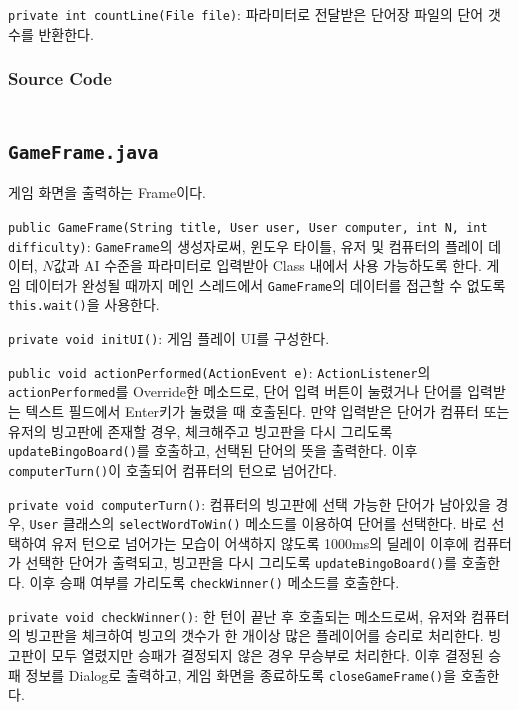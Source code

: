 \texttt{private int countLine(File file)}:
파라미터로 전달받은 단어장 파일의 단어 갯수를 반환한다.

\subsubsection{Source Code}
\inputminted[fontsize=\scriptsize]{java}{../../src/main/java/ywrhee/project/StartFrame.java}

\newpage
\subsection{\texttt{GameFrame.java}}
게임 화면을 출력하는 Frame이다.

\texttt{public GameFrame(String title, User user, User computer, int N, int difficulty)}:
\texttt{GameFrame}의 생성자로써, 윈도우 타이틀, 유저 및 컴퓨터의 플레이 데이터, $N$값과 AI 수준을 파라미터로 입력받아 Class 내에서 사용 가능하도록 한다.
게임 데이터가 완성될 때까지 메인 스레드에서 \texttt{GameFrame}의 데이터를 접근할 수 없도록 \texttt{this.wait()}을 사용한다.

\texttt{private void initUI()}:
게임 플레이 UI를 구성한다.

\texttt{public void actionPerformed(ActionEvent e)}:
\texttt{ActionListener}의 \texttt{actionPerformed}를 Override한 메소드로,
단어 입력 버튼이 눌렸거나 단어를 입력받는 텍스트 필드에서 Enter키가 눌렸을 때 호출된다.
만약 입력받은 단어가 컴퓨터 또는 유저의 빙고판에 존재할 경우, 체크해주고 빙고판을 다시 그리도록 \texttt{updateBingoBoard()}를 호출하고, 선택된 단어의 뜻을 출력한다.
이후 \texttt{computerTurn()}이 호출되어 컴퓨터의 턴으로 넘어간다.

\texttt{private void computerTurn()}:
컴퓨터의 빙고판에 선택 가능한 단어가 남아있을 경우,
\texttt{User} 클래스의 \texttt{selectWordToWin()} 메소드를 이용하여 단어를 선택한다.
바로 선택하여 유저 턴으로 넘어가는 모습이 어색하지 않도록 1000ms의 딜레이 이후에 컴퓨터가 선택한 단어가 출력되고, 빙고판을 다시 그리도록 \texttt{updateBingoBoard()}를 호출한다.
이후 승패 여부를 가리도록 \texttt{checkWinner()} 메소드를 호출한다.

\texttt{private void checkWinner()}:
한 턴이 끝난 후 호출되는 메소드로써, 유저와 컴퓨터의 빙고판을 체크하여 빙고의 갯수가 한 개이상 많은 플레이어를 승리로 처리한다.
빙고판이 모두 열렸지만 승패가 결정되지 않은 경우 무승부로 처리한다.
이후 결정된 승패 정보를 Dialog로 출력하고, 게임 화면을 종료하도록 \texttt{closeGameFrame()}을 호출한다.

